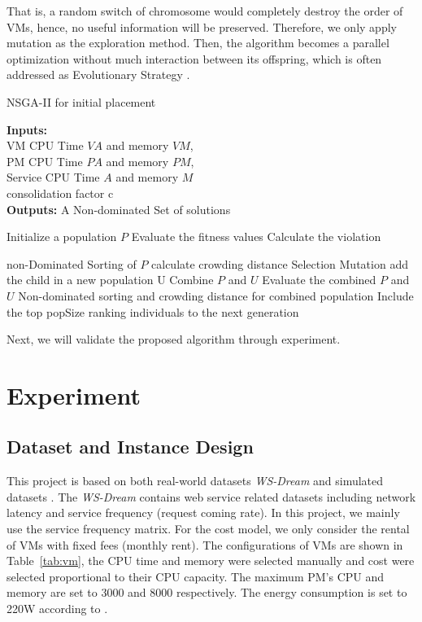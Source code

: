 That is, a random switch of chromosome would completely destroy the order of VMs, 
hence, no useful information will be preserved. 
Therefore, we only apply mutation as the exploration method. Then, the algorithm becomes a parallel optimization without much interaction between its offspring, which is often addressed as Evolutionary Strategy \cite{evo_str}.
\begin{algorithm}[!htb]
 \caption{NSGA-II for initial placement}
 \footnotesize
 \textbf{Inputs:} \\
  VM CPU Time $VA$ and memory $VM$, \\
  PM CPU Time $PA$ and memory $PM$, \\
  Service CPU Time $A$ and memory $M$ \\
  consolidation factor c \\
 \textbf{Outputs:}
  A Non-dominated Set of solutions

 \begin{algorithmic}[1]
  \STATE Initialize a population $P$
      \STATE Evaluate the fitness values
      \STATE Calculate the violation
    \ENDFOR

    \STATE non-Dominated Sorting of $P$
    \STATE calculate crowding distance
      \STATE Selection
      \STATE Mutation
      \STATE add the child in a new population U
    \ENDWHILE
    \STATE Combine $P$ and $U$ 
    \STATE Evaluate the combined $P$ and $U$
    \STATE Non-dominated sorting and crowding distance for combined population
    \STATE Include the top popSize ranking individuals to the next generation

  \ENDWHILE
 \end{algorithmic}
 \label{alg:NSGAII}
\end{algorithm}

Next, we will validate the proposed algorithm through experiment.

\section{Experiment}
\label{sec:exp}
\subsection{Dataset and Instance Design}
This project is based on both real-world datasets \textit{WS-Dream} \cite{Service_dataset} and simulated datasets \cite{Energy_9}. 
The \textit{WS-Dream} contains web service related datasets including network latency and service frequency (request coming rate). In this project, we mainly use the service frequency matrix. For the cost model, we only consider the rental of VMs with fixed fees (monthly rent). The configurations of VMs are shown in Table~\ref{tab:vm}, the CPU time and memory were selected manually and cost were selected proportional to their CPU capacity. The maximum PM's CPU and memory are set to 3000 and 8000 respectively. The energy consumption is set to 220W according to \cite{Energy_9}.

